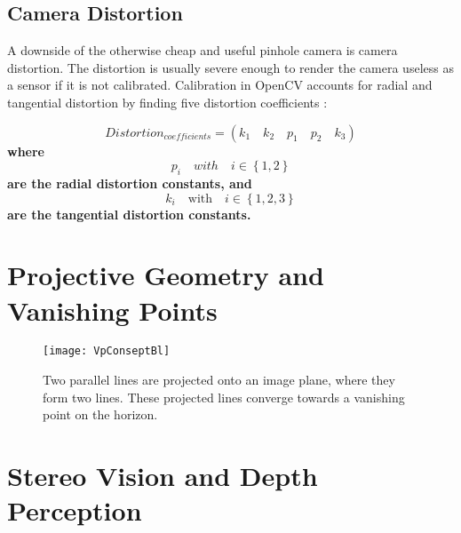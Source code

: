 \subsection{Camera Distortion}

A downside of the otherwise cheap and useful pinhole camera is camera distortion. The distortion is usually severe enough to render the camera useless as a sensor if it is not calibrated. Calibration in OpenCV accounts for radial and tangential distortion by finding five distortion coefficients \cite{3dCalib}:

\begin{equation*}
Distortion_{coefficients} = (k_1 \quad k_2 \quad p_1 \quad p_2 \quad k_3)
\end{equation*}
\textbf{where} 
\begin{equation*}
p_i \quad with \quad i \in \left\{1, 2\right\}
\end{equation*}
\textbf{are the radial distortion constants, and}
\begin{equation*}
k_i \quad \textrm{with} \quad i \in \left\{1, 2, 3\right\}  
\end{equation*}
\textbf{are the tangential distortion constants.} 

\section{Projective Geometry and Vanishing Points}

\begin{wrapfigure}{r}{0.5\textwidth}
	\vspace{-10pt} %
	\centering
	\texttt{[image: VpConseptBl]}
	\caption{\label{fig:VpConseptBl}Two parallel lines are projected onto an image plane, where they form two lines. These projected lines converge towards a vanishing point on the horizon.}
	\vspace{-10pt} %
\end{wrapfigure}

\section{Stereo Vision and Depth Perception}

